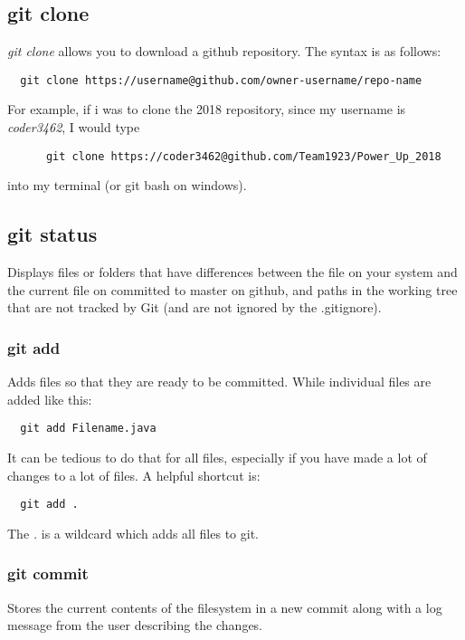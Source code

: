 \documentclass[11pt,fleqn]{article}
\begin{document}
\subsection{git clone}

\textit{git clone} allows you to download a github repository. The syntax is as follows:
\begin{verbatim}
  git clone https://username@github.com/owner-username/repo-name
\end{verbatim}

For example, if i was to clone the 2018 repository, since my username is \textit{coder3462}, I would type
\begin{verbatim}
      git clone https://coder3462@github.com/Team1923/Power_Up_2018
\end{verbatim}
into my terminal (or git bash on windows).

\subsection{git status}

Displays files or folders that have differences between the file on your system and the current file on committed to master on github, and paths in the working tree that are not tracked by Git (and are not ignored by the .gitignore).

\subsubsection{git add}

Adds files so that they are ready to be committed. While individual files are added like this:
\begin{verbatim}
  git add Filename.java
\end{verbatim}
It can be tedious to do that for all files, especially if you have made a lot of changes to a lot of files. A helpful shortcut is:
\begin{verbatim}
  git add .
\end{verbatim}
The \textit{.} is a wildcard which adds all files to git.

\subsubsection{git commit}

Stores the current contents of the filesystem in a new commit along with a log message from the user describing the changes.
\end{document}
